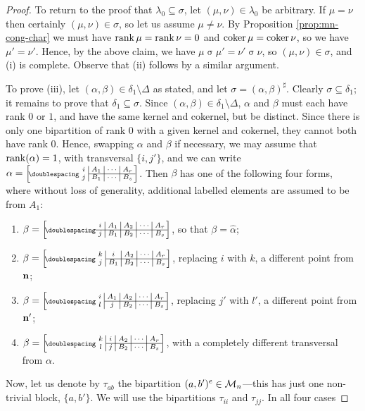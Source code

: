 \begin{lemma}
\begin{proof}
    To return to the proof that $\lambda_0 \subseteq \sigma$, let
    $(\mu, \nu) \in \lambda_0$ be arbitrary.  If $\mu = \nu$ then certainly
    $(\mu, \nu) \in \sigma$, so let us assume $\mu \neq \nu$.  By Proposition
    \ref{prop:mn-cong-char} we must have $\operatorname{rank}\mu = \operatorname{rank}\nu = 0$ and
    $\operatorname{coker}\mu = \operatorname{coker}\nu$, so we have $\mu' = \nu'$.  Hence, by the above
    claim, we have $\mu \mathrel\sigma \mu' = \nu' \mathrel\sigma \nu$,
    so $(\mu, \nu) \in \sigma$, and (i) is complete.  Observe that (ii) follows
    by a similar argument.

    To prove (iii), let $(\alpha,\beta)\in\delta_1\setminus\Delta$ as stated,
    and let $\sigma = (\alpha,\beta)^\sharp$.  Clearly
    $\sigma \subseteq \delta_1$; it remains to prove that
    $\delta_1 \subseteq \sigma$.  Since
    $(\alpha,\beta) \in \delta_1 \setminus \Delta$, $\alpha$ and $\beta$ must
    each have rank $0$ or $1$, and have the same kernel and
    cokernel, but be distinct.  Since there is only one bipartition of rank $0$
    with a given kernel and cokernel, they cannot both have rank $0$.  Hence,
    swapping $\alpha$ and $\beta$ if necessary, we may assume that
    $\operatorname{rank}(\alpha)=1$, with transversal $\{i,j'\}$, and we can write
    $\alpha=\bipart{c|c|c|c}{2-4}
    {i & A_1 & \cdots & A_r}{j & B_1 & \cdots & B_s}$.
    Then $\beta$ has one of the following four forms, where without loss of
    generality, additional labelled elements are assumed to be from $A_1$:
    \begin{enumerate}[\rm(a)]
    \item $\beta = \bipart{c|c|c|c|c}{1-5}
      {i & A_1 & A_2 & \cdots & A_r}{j & B_1 & B_2 & \cdots & B_s}$,
      so that $\beta = \widehat\alpha$;
    \item $\beta = \bipart{c|c|c|c|c}{2-5}
      {k & i & A_2 & \cdots & A_r}{j & B_1 & B_2 & \cdots & B_s}$,
      replacing $i$ with $k$, a different point from $\mathbf{n}$;
    \item $\beta = \bipart{c|c|c|c|c}{2-5}
      {i & A_1 & A_2 & \cdots & A_r}{l & j & B_2 & \cdots & B_s}$,
      replacing $j'$ with $l'$, a different point from $\mathbf{n}'$;
    \item $\beta = \bipart{c|c|c|c|c}{2-5}
      {k & i & A_2 & \cdots & A_r}{l & j & B_2 & \cdots & B_s}$,
      with a completely different transversal from $\alpha$.
    \end{enumerate}
    Now, let us denote by $\tau_{ab}$ the bipartition
    $(a, b')^e \in \mathcal{M}_n$---this has just one non-trivial block, $\{a,b'\}$.
    We will use the bipartitions $\tau_{ii}$ and $\tau_{jj}$. In all four cases

\end{proof}
\end{lemma}
